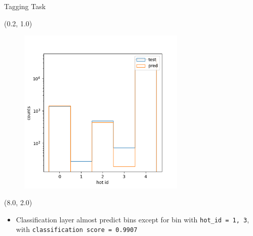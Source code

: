 \documentclass[12pt, xcolor={dvipsnames}, aspectratio = 169]{beamer}
\begin{document}
\begin{frame}[fragile]{Tagging Task}
    \begin{textblock}{8.0}(0.2, 1.0)
        \begin{figure}
            \centering
            \includegraphics[width=8.0cm]{../imgs/cls-hot-id.png}
        \end{figure}
    \end{textblock}
    
    \begin{textblock}{7.0}(8.0, 2.0)
    
    \begin{itemize}
        \item Classification layer almost predict bins except for bin with \verb|hot_id = 1, 3|, with 
        \verb|classification score = 0.9907|
    \end{itemize}
    
    \end{textblock}
    
\end{frame}
\end{document}
